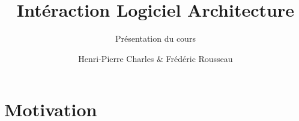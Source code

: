 \documentclass{beamer}
\title{Intéraction Logiciel Architecture}
\subtitle{Présentation du cours}
\author{Henri-Pierre Charles \& Frédéric Rousseau}
\date{}
\newcommand{\Slide}[1]{}
\begin{document}
\titlepage
\section{Motivation}
\Slide{Presentation/Plan}
\Slide{Presentation/Bibliographie}
\end{document}
